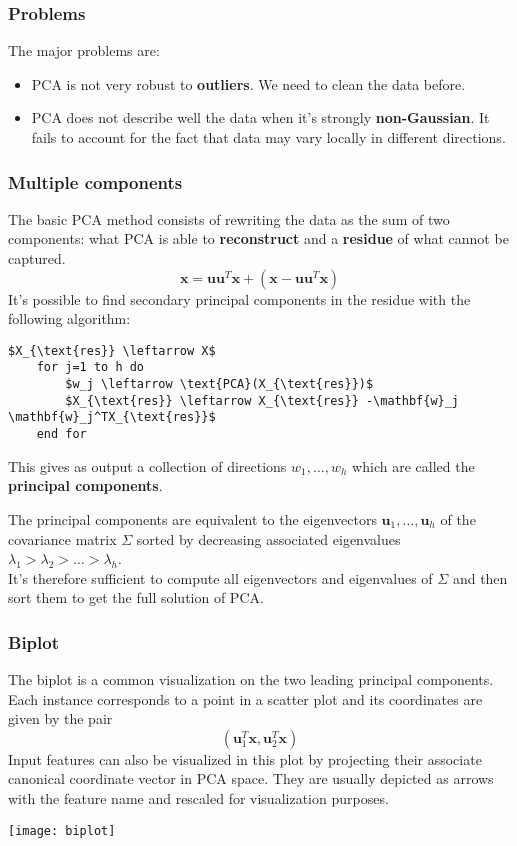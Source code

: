 \subsubsection{Problems} The major problems are:
\begin{itemize}
	\item PCA is not very robust to \textbf{outliers}. We need to clean the data before.
	\item PCA does not describe well the data when it's strongly \textbf{non-Gaussian}. It fails to account for the fact that data may vary locally in different directions.
\end{itemize}
\newpage
\subsubsection{Multiple components}
The basic PCA method consists of rewriting the data as the sum of two components: what PCA is able to \textbf{reconstruct} and a \textbf{residue} of what cannot be captured.
\begin{equation}
	\mathbf{x}=\mathbf{u}\mathbf{u}^T\mathbf{x}+(\mathbf{x}-\mathbf{u}\mathbf{u}^T\mathbf{x})
\end{equation}
It's possible to find secondary principal components in the residue with the following algorithm:
\begin{lstlisting}[mathescape=true]
	$X_{\text{res}} \leftarrow X$
	for j=1 to h do
		$w_j \leftarrow \text{PCA}(X_{\text{res}})$
		$X_{\text{res}} \leftarrow X_{\text{res}} -\mathbf{w}_j \mathbf{w}_j^TX_{\text{res}}$
	end for 
\end{lstlisting}
This gives as output a collection of directions $w_1, \ldots, w_h$ which are called the \textbf{principal components}.

\begin{observation}
	The principal components are equivalent to the eigenvectors $\mathbf{u}_1, \ldots, \mathbf{u}_h$ of the covariance matrix $\Sigma$ sorted by decreasing associated eigenvalues $\lambda_1 > \lambda_2 > \ldots > \lambda_h$.\\
	It's therefore sufficient to compute all eigenvectors and eigenvalues of $\Sigma$ and then sort them to get the full solution of PCA.
\end{observation}

\subsubsection{Biplot}
The biplot is a common visualization on the two leading principal components. Each instance corresponds to a point in a scatter plot and its coordinates are given by the pair
\begin{equation*}
	(\mathbf{u}_1^T\mathbf{x}, \mathbf{u}_2^T\mathbf{x})
\end{equation*}
Input features can also be visualized in this plot by projecting their associate canonical coordinate vector in PCA space. They are usually depicted as arrows with the feature name and rescaled for visualization purposes.
\begin{center}
	\texttt{[image: biplot]}
\end{center}

